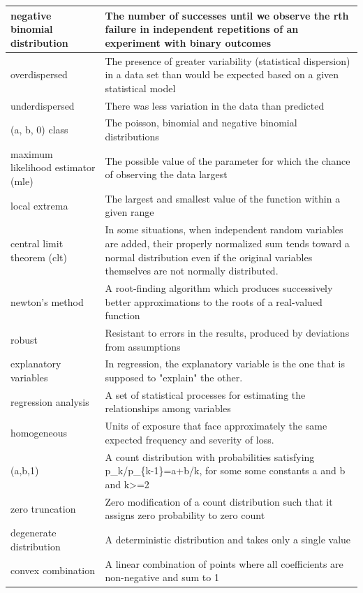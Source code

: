 \documentclass[
]{book}
\begin{document}
\begin{longtable}{>{\raggedright\arraybackslash}p{10em}|>{\raggedright\arraybackslash}p{30em}}
\hline
negative binomial distribution & The number of successes until we observe the rth failure in independent repetitions of an experiment with binary outcomes\\
\hline
overdispersed & The presence of greater variability (statistical dispersion) in a data set than would be expected based on a given statistical model\\
\hline
underdispersed & There was less variation in the data than predicted\\
\hline
(a, b, 0) class & The poisson, binomial and negative binomial distributions\\
\hline
maximum likelihood estimator (mle) & The possible value of the parameter for which the chance of observing the data largest\\
\hline
local extrema & The largest and smallest value of the function within a given range\\
\hline
central limit theorem (clt) & In some situations, when independent random variables are added, their properly normalized sum tends toward a normal distribution even if the original variables themselves are not normally distributed.\\
\hline
newton's method & A root-finding algorithm which produces successively better approximations to the roots of a real-valued function\\
\hline
robust & Resistant to errors in the results, produced by deviations from assumptions\\
\hline
explanatory variables & In regression, the explanatory variable is the one that is supposed to "explain" the other.\\
\hline
regression analysis & A set of statistical processes for estimating the relationships among variables\\
\hline
homogeneous & Units of exposure that face approximately the same expected frequency and severity of loss.\\
\hline
(a,b,1) & A count distribution with probabilities satisfying p\_k/p\_\{k-1\}=a+b/k, for some some constants a and b and k>=2\\
\hline
zero truncation & Zero modification of a count distribution such that it assigns zero probability to zero count\\
\hline
degenerate distribution & A deterministic distribution and takes only a single value\\
\hline
convex combination & A linear combination of points where all coefficients are non-negative and sum to 1\\

\end{longtable}
\end{document}
